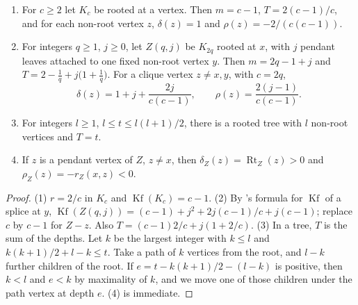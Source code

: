 \documentclass[11pt,a4paper]{report}
\newcommand*{\Kf}{\operatorname{Kf}}
\newcommand*{\Rt}{\operatorname{Rt}}
\begin{document}
\begin{lemma}\label{lem:rooted}
\begin{enumerate}
\item\label{it:clique} For \(c\ge2\) let \(K_c\) be rooted at a vertex. Then \(m=c-1\), \(T=2(c-1)/c\), and for each non-root
vertex \(z\), \(\delta(z)=1\) and \(\rho(z)=-2/(c(c-1))\).
\item\label{it:gadget} For integers \(q\ge1\), \(j\ge0\), let \(Z(q,j)\) be \(K_{2q}\) rooted at \(x\), with \(j\) pendant
leaves attached to one fixed non-root vertex \(y\). Then \(m=2q-1+j\) and \(T=2-\frac1q+j\bigl(1+\frac1q\bigr)\). For a clique
vertex \(z\ne x,y\), with \(c=2q\),
\[\delta(z)=1+j+\frac{2j}{c(c-1)},\qquad\rho(z)=\frac{2(j-1)}{c(c-1)}.\]
\item\label{it:tree} For integers \(l\ge1\), \(l\le t\le l(l+1)/2\), there is a rooted tree with \(l\) non-root vertices and
\(T=t\).
\item\label{it:leaf} If \(z\) is a pendant vertex of \(Z\), \(z\ne x\), then \(\delta_Z(z)=\Rt_Z(z)>0\) and
\(\rho_Z(z)=-r_Z(x,z)<0\).
\end{enumerate}
\end{lemma}
\begin{proof}
(1) \(r=2/c\) in \(K_c\) and \(\Kf(K_c)=c-1\). (2) By 's formula for \(\Kf\) of a splice at \(y\),
\(\Kf(Z(q,j))=(c-1)+j^2+2j(c-1)/c+j(c-1)\); replace \(c\) by \(c-1\) for \(Z-z\). Also
\(T=(c-1)2/c+j(1+2/c)\). (3) In a tree, \(T\) is the sum of the depths. Let \(k\) be the largest integer with \(k\le l\) and
\(k(k+1)/2+l-k\le t\). Take a path of \(k\) vertices from the root, and \(l-k\) further children of the root. If
\(e=t-k(k+1)/2-(l-k)\) is positive, then \(k<l\) and \(e<k\) by maximality of \(k\), and we move one of those children under the path
vertex at depth \(e\). (4) is immediate.
\end{proof}
\end{document}

